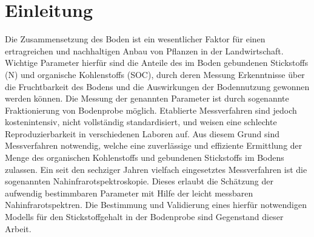 \section{Einleitung}
\label{sec:Einleitung}

    Die Zusammensetzung des Boden ist ein wesentlicher Faktor für einen ertragreichen und nachhaltigen Anbau von Pflanzen in der Landwirtschaft.
    Wichtige Parameter hierfür sind die Anteile des im Boden gebundenen Stickstoffs (N) und organische Kohlenstoffs (SOC), durch deren Messung Erkenntnisse über die Fruchtbarkeit des Bodens und die Auswirkungen der Bodennutzung gewonnen werden können.\cite{Poeplau2013}
    Die Messung der genannten Parameter ist durch sogenannte Fraktionierung von Bodenprobe möglich.
    Etablierte Messverfahren sind jedoch kostenintensiv, nicht vollständig standardisiert, und weisen eine schlechte Reproduzierbarkeit in verschiedenen Laboren auf.\cite{Poeplau2013}
    Aus diesem Grund sind Messverfahren notwendig, welche eine zuverlässige und effiziente Ermittlung der Menge des organischen Kohlenstoffs und gebundenen Stickstoffs im Bodens zulassen.
    Ein seit den sechziger Jahren vielfach eingesetztes Messverfahren ist die sogenannten Nahinfrarotspektroskopie. \cite{Agelet2010}
    Dieses erlaubt die Schätzung der aufwendig bestimmbaren Parameter mit Hilfe der leicht messbaren Nahinfrarotspektren.
    Die Bestimmung und Validierung eines hierfür notwendigen Modells für den Stickstoffgehalt in der Bodenprobe sind Gegenstand dieser Arbeit.

